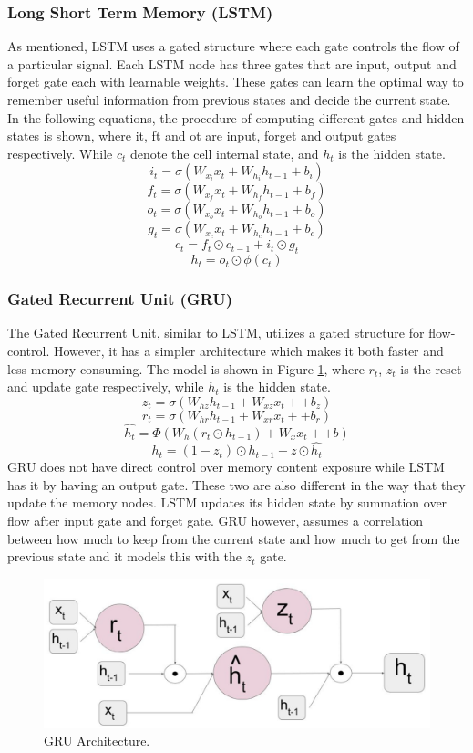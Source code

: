 \documentclass{article}
\begin{document}
\subsubsection{Long Short Term Memory (LSTM)}
\label{long_short_term_memory}
As mentioned, LSTM uses a gated structure where each gate controls the flow of a particular signal. Each LSTM node has three gates that are input, output and forget gate each with learnable weights. These gates can learn the optimal way to remember useful information from previous states and decide the current state.
\\
In the following equations, the procedure of computing different gates and hidden states is shown, where it, ft and ot are input, forget and output gates respectively. While $c_t$ denote the cell internal state, and $h_t$ is the hidden state.
$$i_t = \sigma(W_{x_i} x_t+ W_{h_i} h_{t-1}+b_i)$$
$$f_t = \sigma(W_{x_f} x_t+ W_{h_f} h_{t-1}+b_f)$$
$$o_t = \sigma(W_{x_o} x_t+ W_{h_o} h_{t-1}+b_o)$$
$$g_t = \sigma(W_{x_c} x_t+ W_{h_c} h_{t-1}+b_c)$$
$$c_t = f_t \odot c_{t-1} + i_t \odot g_t$$
$$h_t = o_t \odot \phi(c_t)$$

\subsubsection{Gated Recurrent Unit (GRU)}
\label{gated_recurrent_unit}
The Gated Recurrent Unit, similar to LSTM, utilizes a gated structure for flow-control. However, it has a simpler architecture which makes it both faster and less memory consuming. The model is shown in Figure \ref{fig:gru},  where $r_t$, $z_t$ is the reset and update gate respectively, while $h_t$ is the hidden state.
$$z_t = \sigma(W_{hz} h_{t-1} + W_{xz} x_t+ +b_z)$$
$$r_t = \sigma(W_{hr} h_{t-1} + W_{xr} x_t+ +b_r)$$
$$\hat{h_t} = \Phi (W_{h}( r_t \odot h_{t-1}) + W_x x_t+ +b)$$
$$h_t = (1-z_t)\odot h_{t-1} + z \odot \hat{h_t}$$
GRU does not have direct control over memory content exposure while LSTM has it by having an output gate. These two are also different in the way that they update the memory nodes. LSTM updates its hidden state by summation over flow after input gate and forget gate. GRU however, assumes a correlation between how much to keep from the current state and how much to get from the previous state and it models this with the $z_t$ gate.

\begin{figure}[h]
  \centering
  \includegraphics[scale=0.2]{gru.png} 
  \caption{GRU Architecture.}
  \label{fig:gru}
\end{figure}
\end{document}
